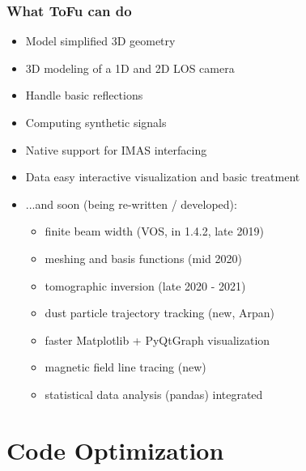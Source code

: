 \documentclass[10pt]{beamer}
\begin{document}
%

\begin{frame}
\frametitle{What ToFu can do}
\begin{itemize}
	\item Model simplified 3D geometry
	\item 3D modeling of a 1D and 2D LOS camera
	\item Handle basic reflections
	\item Computing synthetic signals
	\item Native support for IMAS interfacing
	\item Data easy interactive visualization and basic treatment
	\pause
	\item ...and soon (being re-written / developed):
		\begin{itemize}
			\item finite beam width (VOS, in 1.4.2, late 2019)
			\item meshing and basis functions (mid 2020)
			\item tomographic inversion (late 2020 - 2021)
			\item dust particle trajectory tracking (new, Arpan)
			\item faster Matplotlib + PyQtGraph visualization
			\item magnetic field line tracing (new)
			\item statistical data analysis (pandas) integrated
		\end{itemize}
\end{itemize}
\end{frame}


\section{Code Optimization}
\end{document}
